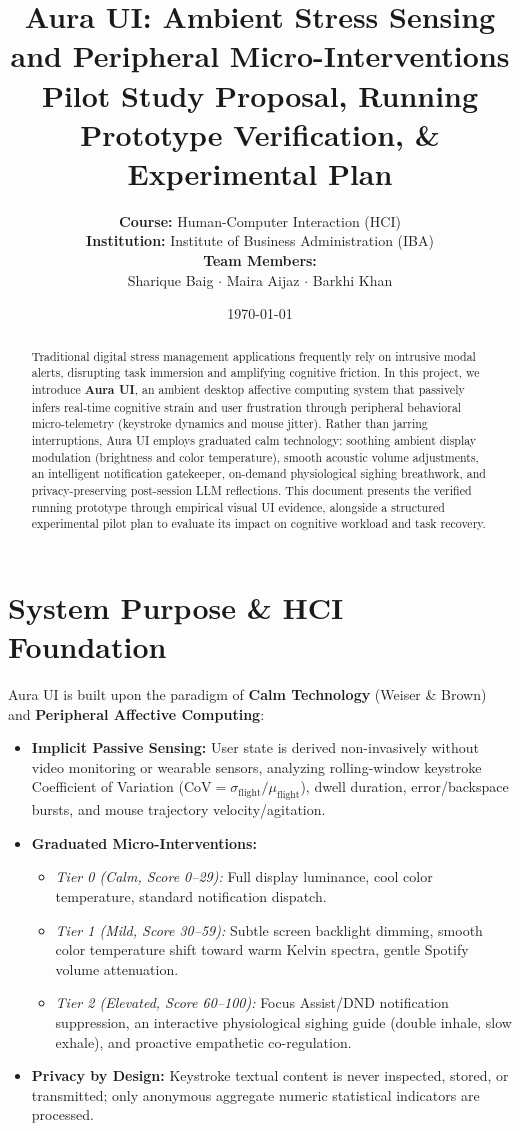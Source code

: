 \documentclass[11pt,a4paper]{article}
\title{
    \vspace{-1.5cm}
    \textbf{\Large Aura UI: Ambient Stress Sensing and Peripheral Micro-Interventions} \\
    \large Pilot Study Proposal, Running Prototype Verification, \& Experimental Plan
}
\author{
    \textbf{Course:} Human-Computer Interaction (HCI) \\[0.15cm]
    \textbf{Institution:} Institute of Business Administration (IBA) \\[0.3cm]
    \textbf{Team Members:} \\[0.1cm]
    Sharique Baig \quad $\cdot$ \quad Maira Aijaz \quad $\cdot$ \quad Barkhi Khan
}
\date{\today}
\begin{document}
\maketitle
\thispagestyle{fancy}

\begin{abstract}
Traditional digital stress management applications frequently rely on intrusive modal alerts, disrupting task immersion and amplifying cognitive friction. In this project, we introduce \textbf{Aura UI}, an ambient desktop affective computing system that passively infers real-time cognitive strain and user frustration through peripheral behavioral micro-telemetry (keystroke dynamics and mouse jitter). Rather than jarring interruptions, Aura UI employs graduated calm technology: soothing ambient display modulation (brightness and color temperature), smooth acoustic volume adjustments, an intelligent notification gatekeeper, on-demand physiological sighing breathwork, and privacy-preserving post-session LLM reflections. This document presents the verified running prototype through empirical visual UI evidence, alongside a structured experimental pilot plan to evaluate its impact on cognitive workload and task recovery.
\end{abstract}

\section{System Purpose \& HCI Foundation}
Aura UI is built upon the paradigm of \textbf{Calm Technology} (Weiser \& Brown) and \textbf{Peripheral Affective Computing}:
\begin{itemize}[leftmargin=1.5em, itemsep=2pt]
    \item \textbf{Implicit Passive Sensing:} User state is derived non-invasively without video monitoring or wearable sensors, analyzing rolling-window keystroke Coefficient of Variation ($\text{CoV} = \sigma_{\text{flight}} / \mu_{\text{flight}}$), dwell duration, error/backspace bursts, and mouse trajectory velocity/agitation.
    \item \textbf{Graduated Micro-Interventions:}
    \begin{itemize}[leftmargin=1.2em, itemsep=1pt]
        \item \textit{Tier 0 (Calm, Score 0--29):} Full display luminance, cool color temperature, standard notification dispatch.
        \item \textit{Tier 1 (Mild, Score 30--59):} Subtle screen backlight dimming, smooth color temperature shift toward warm Kelvin spectra, gentle Spotify volume attenuation.
        \item \textit{Tier 2 (Elevated, Score 60--100):} Focus Assist/DND notification suppression, an interactive physiological sighing guide (double inhale, slow exhale), and proactive empathetic co-regulation.
    \end{itemize}
    \item \textbf{Privacy by Design:} Keystroke textual content is never inspected, stored, or transmitted; only anonymous aggregate numeric statistical indicators are processed.
\end{itemize}
\end{document}
